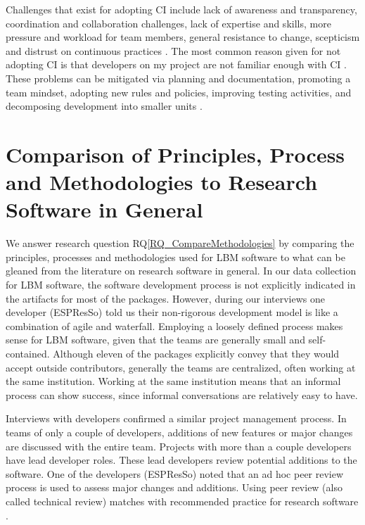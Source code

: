 \documentclass[final, 3p, times, authoryear]{elsarticle}
\newcommand{\rqref}[1]{RQ\ref{#1}}
\begin{document}
Challenges that exist for adopting CI include lack of awareness and
transparency, coordination and collaboration challenges, lack of expertise and
skills, more pressure and workload for team members, general resistance to
change, scepticism and distrust on continuous practices \citep{ShahinEtAl2017}.
The most common reason given for not adopting CI is that developers on my
project are not familiar enough with CI \citep{HiltonEtAl2016}.  These problems
can be mitigated via planning and documentation, promoting a team mindset,
adopting new rules and policies, improving testing activities, and decomposing
development into smaller units \citep{ShahinEtAl2017}.

\section{Comparison of Principles, Process and Methodologies to Research Software in General} \label{Sec_CompareMethodologies}

We answer research question \rqref{RQ_CompareMethodologies} by comparing the
principles, processes and methodologies used for LBM software to what can be
gleaned from the literature on research software in general. In our data
collection for LBM software, the software development process is not explicitly
indicated in the artifacts for most of the packages. However, during our
interviews one developer (ESPResSo) told us their non-rigorous development model
is like a combination of agile and waterfall. Employing a loosely defined
process makes sense for LBM software, given that the teams are generally small
and self-contained.  Although eleven of the packages explicitly convey that they
would accept outside contributors, generally the teams are centralized, often
working at the same institution.  Working at the same institution means that an
informal process can show success, since informal conversations are relatively
easy to have.

Interviews with developers confirmed a similar project management process. In
teams of only a couple of developers, additions of new features or major changes
are discussed with the entire team. Projects with more than a couple developers
have lead developer roles. These lead developers review potential additions to
the software. One of the developers (ESPResSo) noted that an ad hoc peer review
process is used to assess major changes and additions. Using peer review (also
called technical review) matches with recommended practice for research software
\citep{HerouxEtAl2008, Givler2020, OrvizEtAl2017, USGS2019}.
\end{document}
